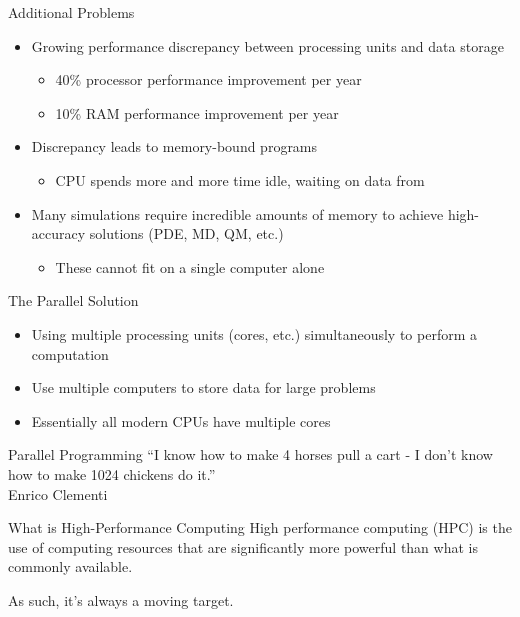 \begin{frame}{Additional Problems}
\begin{itemize}
\item Growing performance discrepancy between processing units and data storage
\begin{itemize}
\item 40\% processor performance improvement per year
\item 10\% RAM performance improvement per year
\end{itemize}
\item Discrepancy leads to memory-bound programs
\begin{itemize}
\item CPU spends more and more time idle, waiting on data from
\end{itemize}
\item Many simulations require incredible amounts of memory to achieve high-accuracy solutions (PDE, MD, QM, etc.)
\begin{itemize}
\item These cannot fit on a single computer alone
\end{itemize}
\end{itemize}
\end{frame}

\begin{frame}{The Parallel Solution}
\begin{itemize}
\item Using multiple processing units (cores, etc.) simultaneously to perform a computation
\item Use multiple computers to store data for large problems
\item Essentially all modern CPUs have multiple cores
\end{itemize}
\end{frame}

\begin{frame}{Parallel Programming}
\centering
``I know how to make 4 horses pull a cart - I don't know how to make 1024
chickens do it.''\\Enrico Clementi
\end{frame}

\begin{frame}{What is High-Performance Computing}
\centering
High performance computing (HPC) is the use of computing resources that are
significantly more powerful than what is commonly available.

As such, it's always a moving target.
\end{frame}

